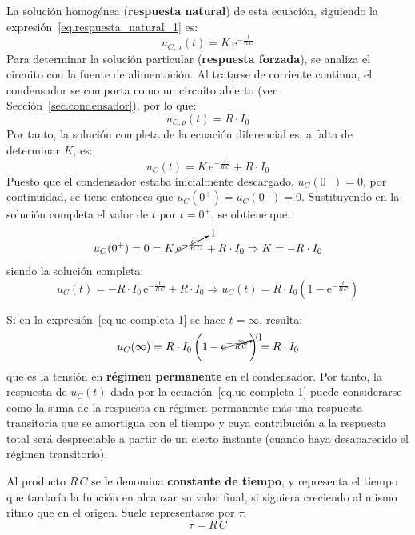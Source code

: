 \documentclass[11pt]{book} %
\numberwithin{dummy}{section}
\theoremstyle{ocrenumbox}
\theoremstyle{blacknumex}
\theoremstyle{blacknumbox}
\theoremstyle{ocrenum}
\newlength\esp
\begin{document}
	La solución homogénea (\textbf{respuesta natural}) de esta ecuación, siguiendo la expresión~\eqref{eq.respuesta_natural_1} es:
	\begin{equation}
	    \boxed{u_{C,n}(t)=K\,\mathrm{e}^{-\frac{t}{R\,C}}}
	\end{equation}
	Para determinar la solución particular (\textbf{respuesta forzada}), se analiza el circuito con la fuente de alimentación. Al tratarse de corriente continua, el condensador se comporta como un circuito abierto (ver Sección~\ref{sec.condensador}), por lo que:
	\begin{equation}
	    \boxed{u_{C,p}(t)=R\cdot I_0}
	\end{equation}
	Por tanto, la solución completa de la ecuación diferencial es, a falta de determinar $K$, es:
	\begin{equation*}{u_C(t)=K\,\mathrm{e}^{-\frac{t}{R\,C}}+R\cdot I_0}
	\end{equation*}
	Puesto que el condensador estaba inicialmente descargado,  $u_C(0^-)=0$, por continuidad, se tiene entonces que $u_C(0^+)=u_C(0^-)=0$. Sustituyendo en la solución completa el valor de $t$ por $t=0^+$, se obtiene que:
	\begin{equation*}
	    u_C(0^+)=0=K\,\cancelto{1}{\mathrm{e}^{-\frac{0^+}{R\,C}}}+R\cdot I_0\Rightarrow K=-R\cdot I_0
	\end{equation*}
	siendo la solución completa:
	\begin{equation}\label{eq.uc-completa-1}
	    u_C(t)=-R\cdot I_0\,\mathrm{e}^{-\frac{t}{R\,C}}+R\cdot I_0\Rightarrow \boxed{u_C(t) =R\cdot I_0\left(1- \mathrm{e}^{-\frac{t}{R\,C}}\right)}
	\end{equation}
	
	Si en la expresión~\eqref{eq.uc-completa-1} se hace $t=\infty$, resulta:
	\begin{equation*}
	    u_C(\infty)=R\cdot I_0\left(1- \cancelto{0}{\mathrm{e}^{-\frac{\infty}{R\,C}}}\right)=R\cdot I_0
	\end{equation*}
	que es la tensión en \textbf{régimen permanente} en el condensador. Por tanto, la respuesta de $u_C(t)$ dada por la ecuación~\eqref{eq.uc-completa-1} puede considerarse como la suma de la respuesta en régimen permanente más una respuesta transitoria que se amortigua con el tiempo y cuya contribución a la respuesta total será despreciable a partir de un cierto instante (cuando haya desaparecido el régimen transitorio). 
	
	Al producto $R\,C$ se le denomina \textbf{constante de tiempo}, y representa el tiempo que tardaría la función en alcanzar su valor final, si siguiera creciendo al mismo ritmo que en el origen. Suele representarse por $\tau$:
	\begin{equation}
	    \boxed{\tau=R\,C}
	\end{equation}
\end{document}
